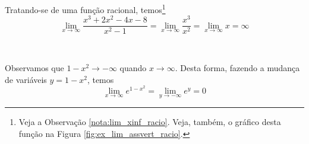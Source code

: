\cleardoublepage\documentclass[../main.tex]{subfiles}
\begin{document}
\begin{exeresol}
\begin{compactenum}[a)]
\begin{resol}
  Tratando-se de uma função racional, temos\footnote{Veja a Observação \ref{nota:lim_xinf_racio}. Veja, também, o gráfico desta função na Figura \ref{fig:ex_lim_assvert_racio}.}
  \begin{equation*}
    \lim_{x\to \infty} \frac{x^3+2x^2-4x-8}{x^2-1} = \lim_{x\to\infty} \frac{x^3}{x^2} = \lim_{x\to \infty} x = \infty
  \end{equation*}
\end{resol}
\item  {}\\
\begin{resol}
   Observamos que $1-x^2\to -\infty$ quando $x\to \infty$. Desta forma, fazendo a mudança de variáveis $y = 1 - x^2$, temos
  \begin{equation*}
    \lim_{x\to\infty} e^{1-x^2} = \lim_{y\to -\infty} e^y = 0
  \end{equation*}
\end{resol}
  \end{compactenum}
 \end{exeresol}
\end{document}
